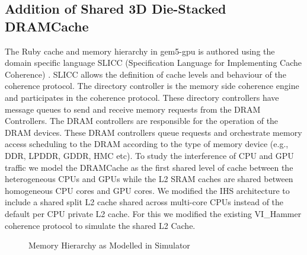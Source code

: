 \subsection{Addition of Shared 3D Die-Stacked DRAMCache}
The Ruby cache and memory hierarchy in gem5-gpu is authored using the domain specific language SLICC (Specification Language for Implementing Cache Coherence) \cite{gems}. SLICC allows the definition of cache levels and behaviour of the coherence protocol. The directory controller is the memory side coherence engine and participates in the coherence protocol. These directory controllers have message queues to send and receive memory requests from the DRAM Controllers. The DRAM controllers are responsible for the operation of the DRAM devices. These DRAM controllers queue requests and orchestrate memory access scheduling to the DRAM according to the type of memory device (e.g., DDR, LPDDR, GDDR, HMC etc). To study the interference of CPU and GPU traffic we model the DRAMCache as the first shared level of cache between the heterogeneous CPUs and GPUs while the L2 SRAM caches are shared between homogeneous CPU cores and GPU cores. We modified the IHS architecture to include a shared split L2 cache shared across multi-core CPUs instead of the default per CPU private L2 cache. For this we modified the existing VI\_Hammer coherence protocol \cite{gem5-gpu} to simulate the shared L2 Cache.
\begin{figure}[!htb]
	\centering
	\def\svgwidth{\columnwidth}
	
	\caption{Memory Hierarchy as Modelled in Simulator}
	\label{fig:simulator-memory}
\end{figure}

